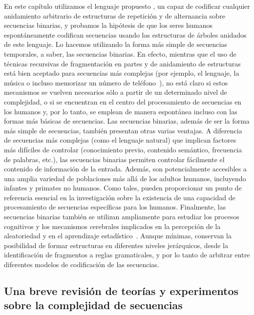 En este capítulo utilizamos el lenguaje propuesto \grambin, un \lot capaz de codificar cualquier anidamiento arbitrario de estructuras de repetición y de alternancia sobre secuencias binarias, y probamos la hipótesis de que los seres humanos espontáneamente codifican secuencias usando las estructuras de árboles anidados de este lenguaje. Lo hacemos utilizando la forma más simple de secuencias temporales, a saber, las secuencias binarias. En efecto, mientras que el uso de técnicas recursivas de fragmentación en partes y de anidamiento de estructuras está bien aceptado para secuencias más complejas (por ejemplo, el lenguaje, la música o incluso memorizar un número de teléfono~\cite{f16}), no está claro si estos mecanismos se vuelven necesarios sólo a partir de un determinado nivel de complejidad, o si se encuentran en el centro del procesamiento de secuencias en los humanos y, por lo tanto, se emplean de manera espontánea incluso con las formas más básicas de secuencias. 
Las secuencias binarias, además de ser la forma más simple de secuencias, también presentan otras varias ventajas. A diferencia de secuencias más complejas (como el lenguaje natural) que implican factores más difíciles de controlar (conocimiento previo, contenido semántico, frecuencia de palabras, etc.), las secuencias binarias permiten controlar fácilmente el contenido de información de la entrada. Además, son potencialmente accesibles a una amplia variedad de poblaciones más allá de los adultos humanos, incluyendo infantes y primates no humanos. Como tales, pueden proporcionar un punto de referencia esencial en la investigación sobre la existencia de una capacidad de procesamiento de secuencias específicas para los humanos. Finalmente, las secuencias binarias también se utilizan ampliamente para estudiar los procesos cognitivos y los mecanismos cerebrales implicados en la percepción de la aleatoriedad y en el aprendizaje estadístico~\cite{f17,f18,f19,f20,f21,f22}. Aunque mínimas, conservan la posibilidad de formar estructuras en diferentes niveles jerárquicos, desde la identificación de fragmentos a reglas gramaticales, y por lo tanto de arbitrar entre diferentes modelos de codificación de las secuencias. 

\subsection{Una breve revisión de teorías y experimentos sobre la complejidad de secuencias}

